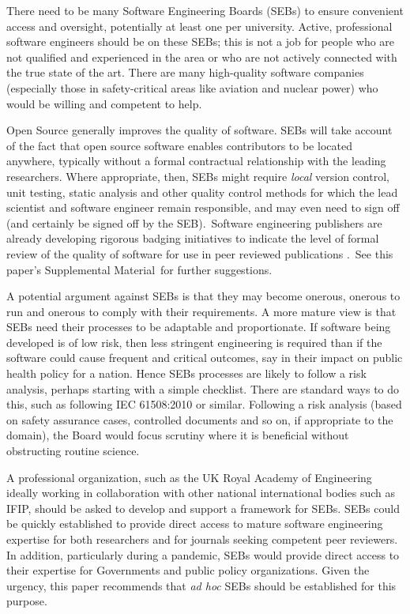 \documentclass[10pt,letterpaper]{article}
\def\supplement{Supplemental Material}
\begin{document}
There need to be many Software Engineering Boards (SEBs) to ensure convenient access and oversight, potentially at least one per university. Active, professional software engineers should be on these SEBs; this is not a job for people who are not qualified and experienced in the area or who are not actively connected with the true state of the art. There are many high-quality software companies (especially those in safety-critical areas like aviation and nuclear power) who would be willing and competent to help.

Open Source generally improves the quality of software. SEBs will take account of the fact that open source software enables contributors to be located anywhere, typically without a formal contractual relationship with the leading researchers. Where appropriate, then, SEBs might require \emph{local\/} version control, unit testing, static analysis {and other quality control methods for which the lead scientist and software engineer remain responsible, and may even need to sign off (and certainly be signed off by the SEB\@).}\ {Software engineering publishers are already developing rigorous badging initiatives to indicate the level of formal review of the quality of software for use in peer reviewed publications \cite{acm-artifacts}.}\ {See this paper's \supplement\ for further suggestions.}

A potential argument against SEBs is that they may become onerous, onerous to run and onerous to comply with their requirements. A more mature view is that SEBs need their processes to be adaptable and proportionate. If software being developed is of low risk, then less stringent engineering is required than if the software could cause frequent and critical outcomes, say in their impact on public health policy for a nation. Hence SEBs processes are likely to follow a risk analysis, perhaps starting with a simple checklist. {There are standard ways to do this, such as following IEC 61508:2010 \cite{redmill,iec61508} or similar. Following a risk analysis (based on safety assurance cases, controlled documents and so on, if appropriate to the domain), the Board would focus scrutiny where it is beneficial without obstructing routine science.}

A professional organization, such as the UK Royal Academy of Engineering ideally working in collaboration with other national international bodies such as IFIP, should be asked to develop and support a framework for SEBs. SEBs could be quickly established to provide direct access to mature software engineering expertise for both researchers and for journals seeking competent peer reviewers. In addition, particularly during a pandemic, SEBs would provide direct access to their expertise for Governments and public policy organizations. Given the urgency, this paper recommends that \emph{ad hoc\/} SEBs should be established for this purpose.
\end{document}
